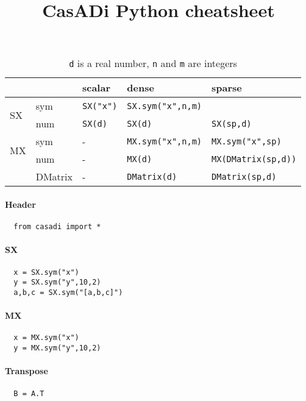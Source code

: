 \documentclass[a4paper,8pt,twocolumn]{article}
\begin{document}
\title{CasADi Python cheatsheet}
\date{}
\maketitle

\begin{center}
\begin{table}
\begin{tabular}{ll|lll}
 & & scalar & dense & sparse \\
\hline
\multirow{2}{*}{SX} & sym & \verb|SX("x")| & \verb|SX.sym("x",n,m)|  &  \\ 
    & num & \verb|SX(d)|  & \verb|SX(d)|  & \verb|SX(sp,d)| \\
\hline
\multirow{2}{*}{MX} & sym & - & \verb|MX.sym("x",n,m)|  & \verb|MX.sym("x",sp)|\\
    & num & - & \verb|MX(d)| &  \verb|MX(DMatrix(sp,d))| \\
\hline
    & DMatrix & -  & \verb|DMatrix(d)|  & \verb|DMatrix(sp,d)| \\
\end{tabular}
\caption{\texttt{d} is a real number, \texttt{n} and \texttt{m} are integers }
\label{tab:constr}
\end{table}
\end{center}



\paragraph{Header}
\begin{verbatim}
  from casadi import *
\end{verbatim}

\paragraph{SX}
\begin{verbatim}
  x = SX.sym("x")
  y = SX.sym("y",10,2)
  a,b,c = SX.sym("[a,b,c]")
\end{verbatim}

\paragraph{MX}
\begin{verbatim}
  x = MX.sym("x")
  y = MX.sym("y",10,2)
\end{verbatim}

\paragraph{Transpose}
\begin{verbatim}
  B = A.T
\end{verbatim}
\end{document}
